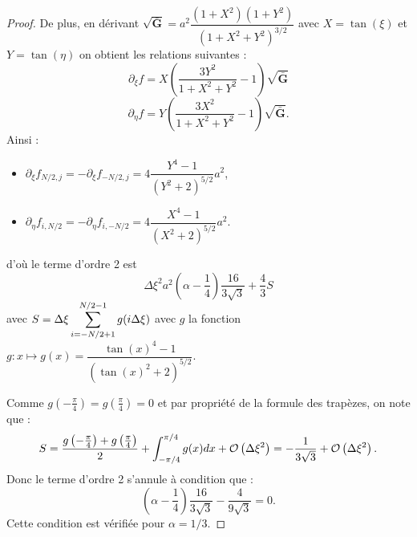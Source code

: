 \begin{proof}
De plus, en dérivant $\sqrt{\bar{\mathbf{G}}} = a^2 \dfrac{(1+X^2)(1+Y^2)}{(1+X^2+Y^2)^{3/2}}$ avec $X=\tan (\xi)$ et $Y=\tan (\eta)$ on obtient les relations suivantes :
\begin{equation}
\partial_{\xi} f = X \left(\dfrac{3Y^2}{1+X^2+Y^2}-1\right) \sqrt{\bar{\mathbf{G}}}
\end{equation}
\begin{equation}
\partial_{\eta} f = Y \left(\dfrac{3X^2}{1+X^2+Y^2}-1\right) \sqrt{\bar{\mathbf{G}}}.
\end{equation}
Ainsi :
\begin{itemize}
\item $\partial_{\xi} f_{N/2,j} = -\partial_{\xi} f_{-N/2,j} = 4 \dfrac{Y^4-1}{(Y^2+2)^{5/2}} a^2$,
\item $\partial_{\eta} f_{i,N/2} = -\partial_{\eta} f_{i,-N/2} = 4 \dfrac{X^4-1}{(X^2+2)^{5/2}} a^2$.
\end{itemize}
d'où le terme d'ordre 2 est
\begin{equation}
\Delta \xi^2 a^2 \left( \alpha - \dfrac{1}{4} \right) \dfrac{16}{3 \sqrt{3}} + \dfrac{4}{3}S
\label{eq:optimalite alpha 2}
\end{equation}
avec $S=\Delta \xi \displaystyle\sum\limits_{i=-N/2+1}^{N/2-1} g(i \Delta \xi)$ avec $g$ la fonction $g:x \mapsto g(x)=\dfrac{\tan(x)^4 -1}{(\tan(x)^2+2)^{5/2}}$.

Comme $g\left(-\frac{\pi}{4} \right)=g\left(\frac{\pi}{4} \right)=0$ et par propriété de la formule des trapèzes, on note que :
\begin{equation}
S = \dfrac{g\left(-\frac{\pi}{4} \right)+g\left(\frac{\pi}{4} \right)}{2} + \displaystyle\int_{-\pi/4}^{\pi/4} g(x)dx + \mathcal{O}\left( \Delta \xi^2 \right) = -\dfrac{1}{3\sqrt{3}} + \mathcal{O}\left( \Delta \xi^2 \right).
\end{equation}
Donc le terme d'ordre 2 s’annule à condition que :
\begin{equation}
\left(\alpha - \dfrac{1}{4} \right) \dfrac{16}{3 \sqrt{3}} - \dfrac{4}{9 \sqrt{3}} = 0.
\end{equation}
Cette condition est vérifiée pour $\alpha = 1/3$.


\end{proof}
